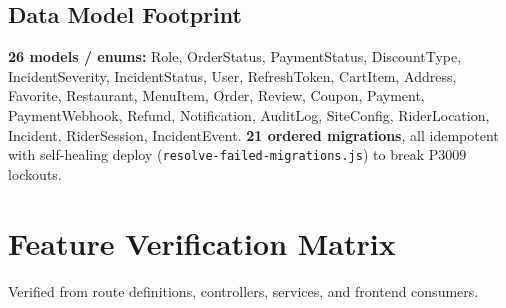 \documentclass[11pt,a4paper]{article}
\begin{document}
\subsection{Data Model Footprint}

\textbf{26 models / enums:} Role, OrderStatus, PaymentStatus, DiscountType,
IncidentSeverity, IncidentStatus, User, RefreshToken, CartItem, Address,
Favorite, Restaurant, MenuItem, Order, Review, Coupon, Payment, PaymentWebhook,
Refund, Notification, AuditLog, SiteConfig, RiderLocation, Incident,
RiderSession, IncidentEvent. \textbf{21 ordered migrations}, all idempotent with
self-healing deploy (\texttt{resolve-failed-migrations.js}) to break P3009 lockouts.

\newpage

\section{Feature Verification Matrix}

Verified from route definitions, controllers, services, and frontend consumers.
\end{document}
